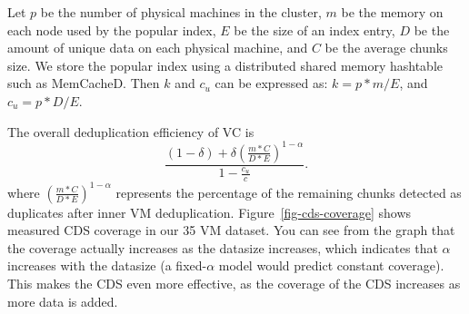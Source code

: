 


Let $p$ be the number of physical machines in the cluster, $m$ be the memory on each node used by the popular
index, $E$ be the size of an index entry,
$D$ be the amount of unique data on each physical machine, and 
$C$ be the average chunks size. We store the popular index using a distributed shared memory hashtable
such as MemCacheD.  Then $k$ and $c_u$ can be expressed as:
$
k = p*m/E$, and $c_u = p*D/E.
$

The overall deduplication efficiency of VC is
\[
\frac{ (1-\delta) + \delta (\frac{m*C}{D*E})^{1-\alpha}}
{ 1- \frac{c_u}{c} }.
\]
where $(\frac{m*C}{D*E})^{1-\alpha}$ represents the percentage of the remaining
chunks detected as duplicates after inner VM deduplication.
Figure~\ref{fig-cds-coverage} shows measured CDS coverage in our 35 VM dataset.
You can see from the graph that the coverage actually increases as the datasize
increases, which indicates that $\alpha$ increases with the datasize (a
fixed-$\alpha$ model would predict constant coverage). This makes the CDS even
more effective, as the coverage of the CDS increases as more data is added.






